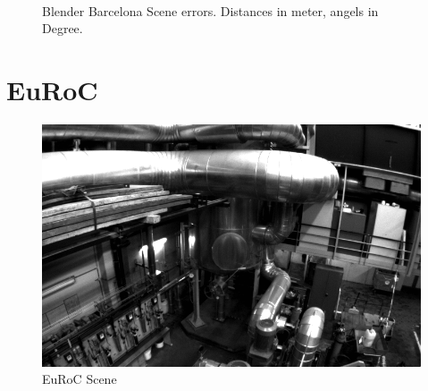 \documentclass[11pt,a4paper,titlepage,oneside]{report}
\begin{document}
\begin{figure}[H]
  \\
  \caption{Blender Barcelona Scene errors. Distances in meter, angels in Degree.}\label{fig:blender_barcelona_diff}
\end{figure}

\section{EuRoC}

\begin{figure}[H]
  \includegraphics[width=1.0\textwidth]{img/euroc_scene.png}
  \caption{EuRoC Scene}\label{fig:euroc_scene}
\end{figure}
\end{document}
